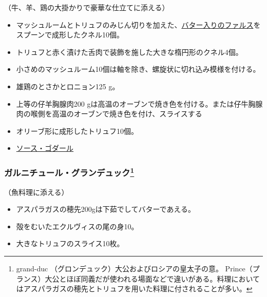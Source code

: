 \begin{recette}


（牛、羊、鶏の大掛かりで豪華な仕立てに添える）

\begin{itemize}
\item
  マッシュルームとトリュフのみじん切りを加えた、\protect\hyperlink{farce-a}{バター入りのファルス}をスプーンで成形したクネル10個。
\item
  トリュフと赤く漬けた舌肉で装飾を施した大きな楕円形のクネル4個。
\item
  小さめのマッシュルーム10個は軸を除き、螺旋状に切れ込み模様を付ける。
\item
  雄鶏のとさかとロニョン125 g。
\item
  上等の仔羊胸腺肉200
  gは高温のオーブンで焼き色を付ける。または仔牛胸腺肉の喉側を高温のオーブンで焼き色を付け、スライスする
\item
  オリーブ形に成形したトリュフ10個。
\item
  \protect\hyperlink{sauce-godard}{ソース・ゴダール}
\end{itemize}

\hypertarget{garniture-grand-duc}{%
\subsubsection[ガルニチュール・グランデュック]{\texorpdfstring{ガルニチュール・グランデュック\footnote{grand-duc
  （グロンデュック）大公およびロシアの皇太子の意。
  Prince（プランス）大公とほぼ同義だが使われる場面などで違いがある。料理においてはアスパラガスの穂先とトリュフを用いた料理に付されることが多い。}}{ガルニチュール・グランデュック}}\label{garniture-grand-duc}}



（魚料理に添える）

\begin{itemize}
\item
  アスパラガスの穂先200gは下茹でしてバターであえる。
\item
  殻をむいたエクルヴィスの尾の身10。
\item
  大きなトリュフのスライス10枚。
\end{itemize}


\end{recette}
